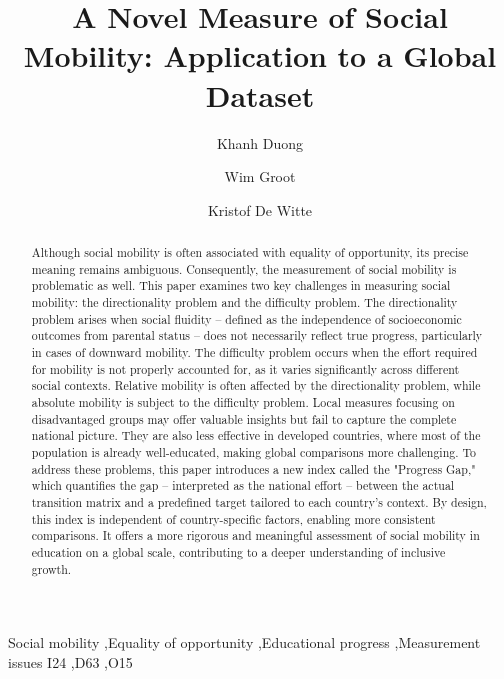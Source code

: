 \documentclass[3p,authoryear,11pt, times]{elsarticle}
\theoremstyle{definition}
\begin{document}
\begin{frontmatter}

\title{A Novel Measure of Social Mobility: Application to a Global Dataset}

\tnotetext[t1]{}

\author[1]{Khanh Duong}
\author[1]{Wim Groot}
\author[1,2]{Kristof De Witte}




    \begin{abstract}

    \noindent  Although social mobility is often associated with equality of opportunity, its precise meaning remains ambiguous. Consequently, the measurement of social mobility is problematic as well. This paper examines two key challenges in measuring social mobility: the directionality problem and the difficulty problem. The directionality problem arises when social fluidity -- defined as the independence of socioeconomic outcomes from parental status -- does not necessarily reflect true progress, particularly in cases of downward mobility. The difficulty problem occurs when the effort required for mobility is not properly accounted for, as it varies significantly across different social contexts. Relative mobility is often affected by the directionality problem, while absolute mobility is subject to the difficulty problem. Local measures focusing on disadvantaged groups may offer valuable insights but fail to capture the complete national picture. They are also less effective in developed countries, where most of the population is already well-educated, making global comparisons more challenging. To address these problems, this paper introduces a new index called the "Progress Gap," which quantifies the gap -- interpreted as the national effort -- between the actual transition matrix and a predefined target tailored to each country's context. By design, this index is independent of country-specific factors, enabling more consistent comparisons. It offers a more rigorous and meaningful assessment of social mobility in education on a global scale, contributing to a deeper understanding of inclusive growth.
    
    \end{abstract}

    \begin{keyword}
    Social mobility \sep Equality of opportunity \sep Educational progress \sep Measurement issues
    \JEL I24 \sep D63 \sep O15 
    \end{keyword}

\end{frontmatter}


\end{document}
